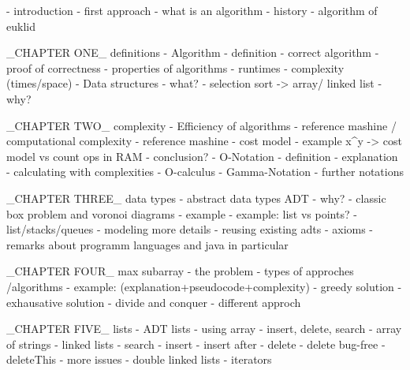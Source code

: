 \documentclass[openright,twoside,headsepline,bibtotoc]{scrbook}[2007/12/24]
\begin{document}
\graphicspath{{./images/}{./images_gnu_tex}}

    \frontmatter
        \maketitle
        \cleardoublepage
        
        \tableofcontents    
        
    \mainmatter
        
        - introduction
        		- first approach
        		- what is an algorithm
        		- history
        		- algorithm of euklid
        		
        	_CHAPTER ONE_ definitions 
        - Algorithm
        		- definition
        		- correct algorithm
        		- proof of correctness
        		- properties of algorithms
        		- runtimes
        		- complexity (times/space)
        	- Data structures
        		- what?
        		- selection sort -> array/ linked list
        		- why?
        	
        	_CHAPTER TWO_ complexity
        	- Efficiency of algorithms
        		- reference mashine / computational complexity
        		- reference mashine
        		- cost model
        		- example x^y -> cost model vs count ops in RAM
        		- conclusion?
        	- O-Notation
        		- definition
        		- explanation
        		- calculating with complexities
        		- O-calculus
        		- Gamma-Notation
        		- further notations
        	
        	_CHAPTER THREE_ data types
        	- abstract data types ADT
			- why?
			- classic box problem and voronoi diagrams
        		- example
        		- example: list vs points?
        		- list/stacks/queues
        		- modeling more details
        		- reusing existing adts
        		- axioms
        		- remarks about programm languages and java in particular
        		
        	_CHAPTER FOUR_ max subarray
        	- the problem
    		- types of approches /algorithms
   	    - example: (explanation+pseudocode+complexity)
       		- greedy solution
        		- exhausative solution
        		- divide and conquer
        		- different approch
        			
        	_CHAPTER FIVE_ lists
        	- ADT lists
        	- using array
        		- insert, delete, search
        		- array of strings
        	- linked lists
        		- search
        		- insert
        		- insert after
        		- delete
        		- delete bug-free
        		- deleteThis
        		- more issues
        	- double linked lists
        	- iterators
        	
\end{document}
